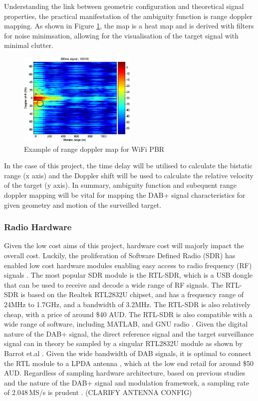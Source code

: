 \documentclass[12pt,a4paper]{article}
\begin{document}
\par \vspace{0.5cm} 
\noindent Understanding the link between geometric configuration and theoretical signal properties, the practical manifestation of the ambiguity function is range doppler mapping. As shown in Figure \ref{fig:rangeDoppler}, the map is a heat map and is derived with filters for noise minimsation, allowing for the visualisation of the target signal with minimal clutter. 
\begin{figure}[htbp]
    \centering
    \includegraphics[width=0.5\textwidth]{rangeDoppler.jpg}
    \caption{Example of range doppler map for WiFi PBR \cite{FundamentalsPassiveRadar}}
    \label{fig:rangeDoppler}
\end{figure}
\par  
\noindent In the case of this project, the time delay will be utilised to calculate the bistatic range (x axis) and the Doppler shift will be used to calculate the relative velocity of the target (y axis). In summary, ambiguity function and subequent range doppler mapping will be vital for mapping the DAB+ signal characteristics for given geometry and motion of the surveilled target.
\subsubsection{Radio Hardware}
Given the low cost aims of this project, hardware cost will majorly impact the overall cost. Luckily, the proliferation of Software Defined Radio (SDR) has enabled low cost hardware modules enabling easy access to radio frequency (RF) signals \cite{SDRtheory}. The most popular SDR module is the RTL-SDR, which is a USB dongle that can be used to receive and decode a wide range of RF signals. The RTL-SDR is based on the Realtek RTL2832U chipset, and has a frequency range of 24MHz to 1.7GHz, and a bandwidth of 3.2MHz. The RTL-SDR is also relatively cheap, with a price of around \$40 AUD. The RTL-SDR is also compatible with a wide range of software, including MATLAB, and GNU radio \cite{SDRdongle}. Given the digital nature of the DAB+ signal, the direct reference signal and the target surveillance signal can in theory be sampled by a singular RTL2832U module as shown by Barrot et.al \cite{DABsingleRadar}. Given the wide bandwidth of DAB signals, it is optimal to connect the RTL module to a LPDA antenna \cite{AntennaHW}, which at the low end retail for around \$50 AUD. Regardless of sampling hardware architecture, based on previous studies and the nature of the DAB+ signal and modulation framework, a sampling rate of 2.048\,MS/s is prudent \cite{IOTpassiveRadar}. (CLARIFY ANTENNA CONFIG)
\end{document}
